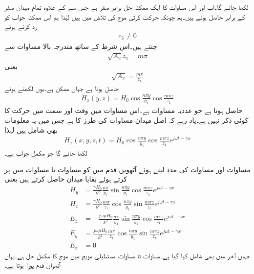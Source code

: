 لکھا جائے گا۔اب   اور اس مساوات کا ایک ممکنہ حل  برابر صفر ہے جس سے  کے علاوہ تمام میدان صفر کے برابر حاصل ہوتے ہیں۔ہم چونکہ حرکت کرتی موج کی تلاش میں ہیں لہٰذا ہم اس ممکنہ جواب کو رد کرتے ہوئے
\begin{align}
c_3 \ne 0
\end{align}
چنتے ہیں۔اس شرط کے ساتھ مندرجہ بالا مساوات سے
\begin{align}
\sqrt{A_2} z_1 = m\pi
\end{align}
یعنی
\begin{align}\label{مساوات_مویج_عمومی_حل_دوسرا_مستقل}
\sqrt{A_2}=\frac{m \pi}{z_1}
\end{align}
حاصل ہوتا ہے جہاں  ممکن ہے۔یوں  لکھتے ہوئے
\begin{align}\label{مساوات_مویج_موج_حل_ث}
H_x(y,z)=H_0 \cos \frac{n \pi y}{y_1}  \cos  \frac{m \pi z}{z_1}
\end{align}
حاصل ہوتا ہے جو عددیہ مساوات ہے۔اس مساوات میں وقت  اور  سمت میں حرکت کا کوئی ذکر نہیں ہے۔یاد رہے کہ اصل میدان مساوات  کی طرز کا ہے جس میں یہ معلومات بھی شامل ہیں  لہٰذا
 \begin{align}\label{مساوات_مویج_مکمل_الف}
H_x(x,y,z,t)=H_0 \cos \frac{n \pi y}{y_1}  \cos  \frac{m \pi z}{z_1} e^{j \omega t -\gamma x}
\end{align}
لکھا جائے گا جو مکمل جواب ہے۔

مساوات  اور مساوات  کی مدد لیتے ہوئے آٹھویں قدم میں  کو مساوات  تا مساوات  میں پر کرتے ہوئے بقایا میدان حاصل کرتے ہیں یعنی
\begin{align}
H_y&=\frac{\gamma H_0}{k^2}\frac{n \pi}{y_1} \sin \frac{n\pi y}{y_1} \cos \frac{m \pi z}{z_1} e^{j \omega t -\gamma x} \label{مساوات_مویج_مکمل_ب}\\
H_z&=\frac{\gamma H_0}{k^2}\frac{m \pi}{z_1} \cos \frac{n\pi y}{y_1} \sin \frac{m \pi z}{z_1} e^{j \omega t -\gamma x}\label{مساوات_مویج_مکمل_پ}\\
E_z&=-\frac{j \omega \mu H_0}{k^2}\frac{n \pi}{y_1} \sin \frac{n\pi y}{y_1} \cos \frac{m \pi z}{z_1} e^{j \omega t -\gamma x}\label{مساوات_مویج_مکمل_ت}\\
E_y&=\frac{j \omega \mu H_0}{k^2}\frac{m \pi}{z_1} \cos \frac{n\pi y}{y_1} \sin \frac{m \pi z}{z_1} e^{j \omega t -\gamma x}\label{مساوات_مویج_مکمل_ٹ}\\
E_x&=0 \label{مساوات_مویج_مکمل_ث}
\end{align}
جہاں آخر میں  بھی شامل کیا گیا ہے۔مساوات  تا مساوات  مستطیلی مویج میں  موج کا مکمل حل ہے۔یہاں آٹھواں قدم پورا ہوتا ہے۔

